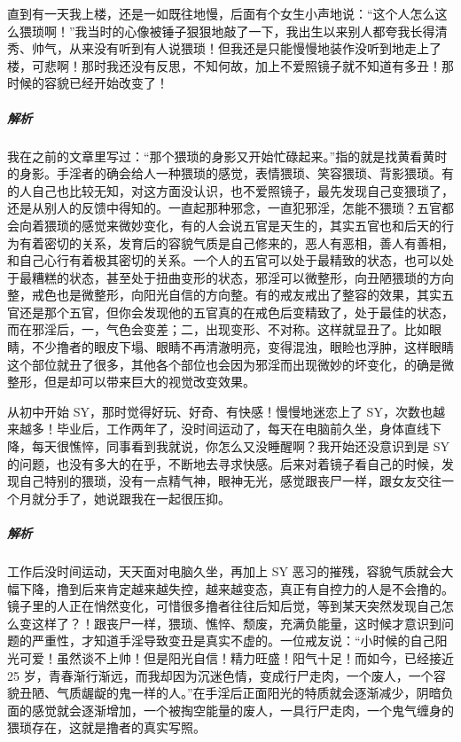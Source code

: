 \begin{case}
    直到有一天我上楼，还是一如既往地慢，后面有个女生小声地说：“这个人怎么这么猥琐啊！”我当时的心像被锤子狠狠地敲了一下，我出生以来别人都夸我长得清秀、帅气，从来没有听到有人说猥琐！但我还是只能慢慢地装作没听到地走上了楼，可悲啊！那时我还没有反思，不知何故，加上不爱照镜子就不知道有多丑！那时候的容貌已经开始改变了！
    \subparagraph{解析} 我在之前的文章里写过：“那个猥琐的身影又开始忙碌起来。”指的就是找黄看黄时的身影。手淫者的确会给人一种猥琐的感觉，表情猥琐、笑容猥琐、背影猥琐。有的人自己也比较无知，对这方面没认识，也不爱照镜子，最先发现自己变猥琐了，还是从别人的反馈中得知的。一直起那种邪念，一直犯邪淫，怎能不猥琐？五官都会向着猥琐的感觉来微妙变化，有的人会说五官是天生的，其实五官也和后天的行为有着密切的关系，发育后的容貌气质是自己修来的，恶人有恶相，善人有善相，和自己心行有着极其密切的关系。一个人的五官可以处于最精致的状态，也可以处于最糟糕的状态，甚至处于扭曲变形的状态，邪淫可以微整形，向丑陋猥琐的方向整，戒色也是微整形，向阳光自信的方向整。有的戒友戒出了整容的效果，其实五官还是那个五官，但你会发现他的五官真的在戒色后变精致了，处于最佳的状态，而在邪淫后，一，气色会变差；二，出现变形、不对称。这样就显丑了。比如眼睛，不少撸者的眼皮下塌、眼睛不再清澈明亮，变得混浊，眼睑也浮肿，这样眼睛这个部位就丑了很多，其他各个部位也会因为邪淫而出现微妙的坏变化，的确是微整形，但是却可以带来巨大的视觉改变效果。
\end{case}

\begin{case}
    从初中开始 SY，那时觉得好玩、好奇、有快感！慢慢地迷恋上了 SY，次数也越来越多！毕业后，工作两年了，没时间运动了，每天在电脑前久坐，身体直线下降，每天很憔悴，同事看到我就说，你怎么又没睡醒啊？我开始还没意识到是 SY 的问题，也没有多大的在乎，不断地去寻求快感。后来对着镜子看自己的时候，发现自己特别的猥琐，没有一点精气神，眼神无光，感觉跟丧尸一样，跟女友交往一个月就分手了，她说跟我在一起很压抑。
    \subparagraph{解析} 工作后没时间运动，天天面对电脑久坐，再加上 SY 恶习的摧残，容貌气质就会大幅下降，撸到后来肯定越来越失控，越来越变态，真正有自控力的人是不会撸的。镜子里的人正在悄然变化，可惜很多撸者往往后知后觉，等到某天突然发现自己怎么变这样了？！跟丧尸一样，猥琐、憔悴、颓废，充满负能量，这时候才意识到问题的严重性，才知道手淫导致变丑是真实不虚的。一位戒友说：“小时候的自己阳光可爱！虽然谈不上帅！但是阳光自信！精力旺盛！阳气十足！而如今，已经接近 25 岁，青春渐行渐远，而我却因为沉迷色情，变成行尸走肉，一个废人，一个容貌丑陋、气质龌龊的鬼一样的人。”在手淫后正面阳光的特质就会逐渐减少，阴暗负面的感觉就会逐渐增加，一个被掏空能量的废人，一具行尸走肉，一个鬼气缠身的猥琐存在，这就是撸者的真实写照。
\end{case}

